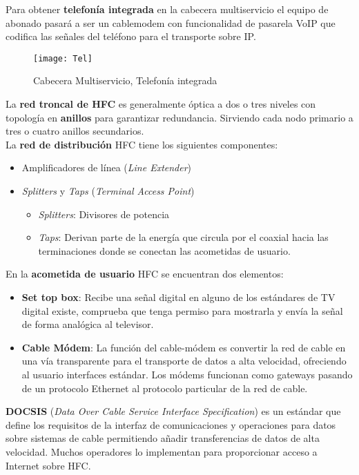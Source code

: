\documentclass[10pt,portrait, twocolumn]{article}
\begin{document}
Para obtener \textbf{telefonía integrada} en la cabecera multiservicio el equipo de abonado pasará a ser un cablemodem con funcionalidad de pasarela VoIP que codifica las señales del teléfono para el transporte sobre IP.

\begin{figure}[!ht]	
	\centering
    	\texttt{[image: Tel]}
	\caption{Cabecera Multiservicio, Telefonía integrada}
	\label{fig:Tel}
\end{figure}    

La \textbf{red troncal de HFC} es generalmente óptica a dos o tres niveles con topología en \textbf{anillos} para garantizar redundancia. Sirviendo cada nodo primario a tres o cuatro anillos secundarios.\\

La \textbf{red de distribución} HFC tiene los siguientes componentes:

	\begin{itemize}
	\item Amplificadores de línea (\textit{Line Extender})
	\item \textit{Splitters} y \textit{Taps} (\textit{Terminal Access Point})
		\begin{itemize}
		\item \textit{Splitters}: Divisores de potencia
		\item \textit{Taps}: Derivan parte de la energía que circula por el coaxial hacia las terminaciones donde se conectan las acometidas de usuario.
		\end{itemize}
	\end{itemize}
	
En la \textbf{acometida de usuario} HFC se encuentran dos elementos:

	\begin{itemize}
	\item \textbf{Set top box}: Recibe una señal digital en alguno de los estándares de TV digital existe, comprueba que tenga permiso para mostrarla y envía la señal de forma analógica al televisor.
	\item \textbf{Cable Módem}: La función del cable-módem es convertir la red de cable en una vía transparente para el transporte de datos a alta velocidad, ofreciendo al usuario interfaces estándar. Los módems funcionan como gateways pasando de un protocolo Ethernet al protocolo particular de la red de cable.
	\end{itemize}

\textbf{DOCSIS} (\textit{Data Over Cable Service Interface Specification}) es un estándar que define los requisitos de la interfaz de comunicaciones y operaciones para datos sobre sistemas de cable permitiendo añadir transferencias de datos de alta velocidad. Muchos operadores lo implementan para proporcionar acceso a Internet sobre HFC.
\end{document}
